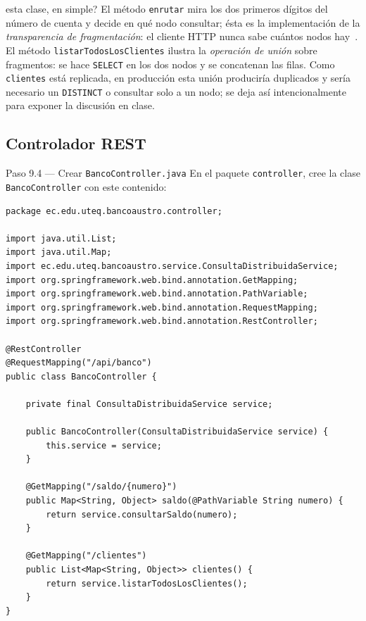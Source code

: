 \documentclass[11pt,a4paper]{article}
\begin{document}
\begin{conceptobox}{esta clase, en simple?}
El m\'etodo \texttt{enrutar} mira los dos primeros d\'igitos del n\'umero de cuenta y decide en qu\'e nodo consultar; \'esta es la implementaci\'on de la \emph{transparencia de fragmentaci\'on}: el cliente HTTP nunca sabe cu\'antos nodos hay~\cite[cap.~1]{Ozsu2020Principles}. El m\'etodo \texttt{listarTodosLosClientes} ilustra la \emph{operaci\'on de uni\'on} sobre fragmentos: se hace \texttt{SELECT} en los dos nodos y se concatenan las filas. Como \texttt{clientes} est\'a replicada, en producci\'on esta uni\'on producir\'ia duplicados y ser\'ia necesario un \texttt{DISTINCT} o consultar solo a un nodo; se deja as\'i intencionalmente para exponer la discusi\'on en clase.
\end{conceptobox}

\subsection{Controlador REST}

\begin{pasobox}{Paso 9.4 --- Crear \texttt{BancoController.java}}
En el paquete \texttt{controller}, cree la clase \texttt{BancoController} con este contenido:

\begin{lstlisting}[style=javastyle,caption={controller/BancoController.java}]
package ec.edu.uteq.bancoaustro.controller;

import java.util.List;
import java.util.Map;
import ec.edu.uteq.bancoaustro.service.ConsultaDistribuidaService;
import org.springframework.web.bind.annotation.GetMapping;
import org.springframework.web.bind.annotation.PathVariable;
import org.springframework.web.bind.annotation.RequestMapping;
import org.springframework.web.bind.annotation.RestController;

@RestController
@RequestMapping("/api/banco")
public class BancoController {

    private final ConsultaDistribuidaService service;

    public BancoController(ConsultaDistribuidaService service) {
        this.service = service;
    }

    @GetMapping("/saldo/{numero}")
    public Map<String, Object> saldo(@PathVariable String numero) {
        return service.consultarSaldo(numero);
    }

    @GetMapping("/clientes")
    public List<Map<String, Object>> clientes() {
        return service.listarTodosLosClientes();
    }
}
\end{lstlisting}
\end{pasobox}
\end{document}
